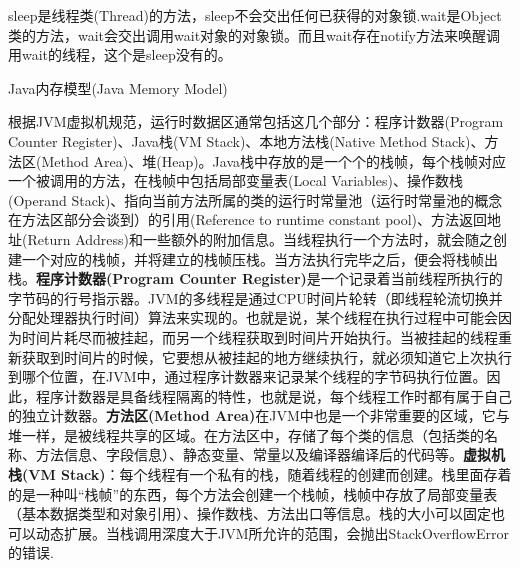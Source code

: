 \documentclass[8pt]{book}
\makeatletter
\numberwithin{dummy}{section}
\theoremstyle{ocrenumbox}
\theoremstyle{blacknumex}
\theoremstyle{blacknumbox}
\theoremstyle{ocrenum}
\renewcommand\paragraph{\@startsection{paragraph}{4}{\z@}
	{-2ex \@plus-.2ex \@minus .2ex}
	{.1ex}
	{\normalfont\small\sffamily\bfseries}}
\makeatother
\begin{document}
sleep是线程类(Thread)的方法，sleep不会交出任何已获得的对象锁.wait是Object类的方法，wait会交出调用wait对象的对象锁。而且wait存在notify方法来唤醒调用wait的线程，这个是sleep没有的。

\paragraph{Java内存模型(Java Memory Model)}

根据JVM虚拟机规范，运行时数据区通常包括这几个部分：程序计数器(Program Counter Register)、Java栈(VM Stack)、本地方法栈(Native Method Stack)、方法区(Method Area)、堆(Heap)。Java栈中存放的是一个个的栈帧，每个栈帧对应一个被调用的方法，在栈帧中包括局部变量表(Local Variables)、操作数栈(Operand Stack)、指向当前方法所属的类的运行时常量池（运行时常量池的概念在方法区部分会谈到）的引用(Reference to runtime constant pool)、方法返回地址(Return Address)和一些额外的附加信息。当线程执行一个方法时，就会随之创建一个对应的栈帧，并将建立的栈帧压栈。当方法执行完毕之后，便会将栈帧出栈。\textbf{程序计数器(Program Counter Register)}是一个记录着当前线程所执行的字节码的行号指示器。JVM的多线程是通过CPU时间片轮转（即线程轮流切换并分配处理器执行时间）算法来实现的。也就是说，某个线程在执行过程中可能会因为时间片耗尽而被挂起，而另一个线程获取到时间片开始执行。当被挂起的线程重新获取到时间片的时候，它要想从被挂起的地方继续执行，就必须知道它上次执行到哪个位置，在JVM中，通过程序计数器来记录某个线程的字节码执行位置。因此，程序计数器是具备线程隔离的特性，也就是说，每个线程工作时都有属于自己的独立计数器。\textbf{方法区(Method Area)}在JVM中也是一个非常重要的区域，它与堆一样，是被线程共享的区域。在方法区中，存储了每个类的信息（包括类的名称、方法信息、字段信息）、静态变量、常量以及编译器编译后的代码等。\textbf{虚拟机栈(VM Stack)}：每个线程有一个私有的栈，随着线程的创建而创建。栈里面存着的是一种叫“栈帧”的东西，每个方法会创建一个栈帧，栈帧中存放了局部变量表（基本数据类型和对象引用）、操作数栈、方法出口等信息。栈的大小可以固定也可以动态扩展。当栈调用深度大于JVM所允许的范围，会抛出StackOverflowError的错误.
\end{document}
